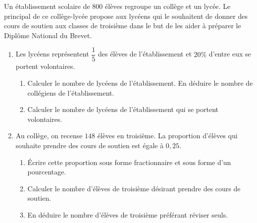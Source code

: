 \documentclass[10pt,openright,twoside,french]{book}
\begin{document}
\exo Un établissement scolaire de $800$ élèves regroupe un collège et un lycée. Le principal de ce collège-lycée propose aux lycéens qui le souhaitent de donner des cours de soutien aux classes de troisième dans le but de les aider à préparer le Diplôme National du Brevet.

\begin{enumerate}
    \item Les lycéens représentent $\dfrac 15$ des élèves de l'établissement et $20\%$ d'entre eux se portent volontaires.
    \begin{enumerate}
        \item Calculer le nombre de lycéens de l'établissement. En déduire le nombre de collégiens de l'établissement.
        \item Calculer le nombre de lycéens de l'établissement qui se portent volontaires.
    \end{enumerate}
    \item Au collège, on recense $148$ élèves en troisième. La proportion d'élèves qui souhaite prendre des cours de soutien est égale à $0,25$.
        \begin{enumerate}
            \item \'Ecrire cette proportion sous forme fractionnaire et sous forme d'un pourcentage.
            \item Calculer le nombre d'élèves de troisième désirant prendre des cours de soutien.
            \item En déduire le nombre d'élèves de troisième préférant réviser seuls.
        \end{enumerate}
\end{enumerate}
\end{document}
